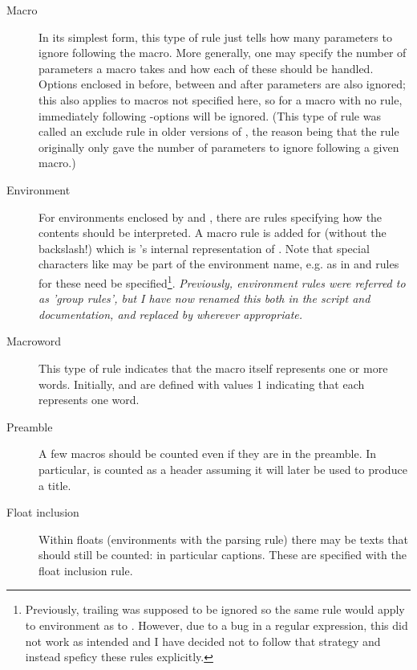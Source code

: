 \documentclass{article}
\begin{document}
\begin{description}

\item[Macro]In its simplest form, this type of rule just tells how many parameters to ignore following the macro. More generally, one may specify the number of parameters a macro takes and how each of these should be handled. Options enclosed in \code{[]} before, between and after parameters are also ignored; this also applies to macros not specified here, so for a macro with no rule, immediately following \code{[]}-options will be ignored. (This type of rule was called an exclude rule in older versions of \TeXcount{}, the reason being that the rule originally only gave the number of
parameters to ignore following a given macro.)

\item[Environment]For environments enclosed by  and , there are rules specifying how the contents should be interpreted. A macro rule is added for  (without the backslash!) which is \TeXcount{}'s internal representation of . Note that special characters like \code{*} may be part of the environment name, e.g. as in  and rules for these need be specified\footnote{Previously, trailing \code{*} was supposed to be ignored so the same rule would apply to environment  as to . However, due to a bug in a regular expression, this did not work as intended and I have decided not to follow that strategy and instead speficy these rules explicitly.}. \emph{Previously, environment rules were referred to as 'group rules', but I have now renamed this both in the \TeXcount{} script and documentation, and replaced  by  wherever appropriate.}

\item[Macroword]This type of rule indicates that the macro itself represents one or more words. Initially,  and  are defined with values 1 indicating that each represents one word.

\item[Preamble]A few macros should be counted even if they are in the preamble. In particular,  is counted as a header assuming it will later be used to produce a title.

\item[Float inclusion]Within floats (environments with the  parsing rule) there may be texts that should still be counted: in particular captions. These are specified with the float inclusion rule.

\end{description}
\end{document}
